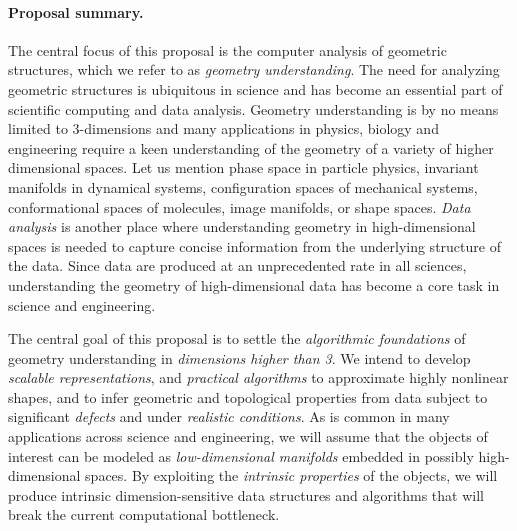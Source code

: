 

\paragraph{Proposal summary.} 
The central focus of this proposal is the computer analysis of
geometric structures, which we refer to as {\em geometry
  understanding}.  The need for analyzing geometric structures is
ubiquitous in science and has become an essential part of scientific
computing and data analysis. Geometry understanding is by no means
limited to 3-dimensions and many applications in physics, biology and
engineering require a keen understanding of the geometry of a variety
of higher dimensional spaces. Let us mention phase space in particle
physics, invariant manifolds in dynamical systems, configuration
spaces of mechanical systems, conformational spaces of molecules,
image manifolds, or shape spaces.
{\em Data analysis}  is another place where understanding
geometry in high-dimensional spaces is needed to
capture concise information from the underlying structure of the data.  
Since data are produced at an unprecedented rate in all
sciences, understanding the geometry of high-dimensional data %
has become a core task in science and engineering.

The central goal of this proposal is to settle the {\em algorithmic
foundations} of geometry understanding in {\em dimensions higher than
3}.  We intend to develop {\em scalable representations}, and {\em
practical algorithms} to approximate highly nonlinear shapes, and to
infer geometric and topological properties from data subject to
significant {\em defects} and under {\em realistic conditions}.
As is common in many applications across science and engineering, we
will assume that the objects of interest can be modeled as {\em
  low-dimensional manifolds} embedded in possibly high-dimensional
spaces. By exploiting the {\em intrinsic properties} of the objects,
we will produce intrinsic dimension-sensitive data structures and algorithms
that will break the current computational
bottleneck.

